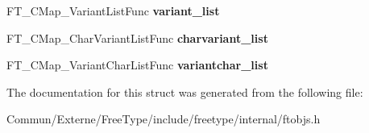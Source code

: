 \begin{DoxyCompactItemize}
\item 
F\+T\+\_\+\+C\+Map\+\_\+\+Variant\+List\+Func {\bfseries variant\+\_\+list}\hypertarget{struct_f_t___c_map___class_rec___ad61635444cbfc71c4259e74cb892c172}{}\label{struct_f_t___c_map___class_rec___ad61635444cbfc71c4259e74cb892c172}

\item 
F\+T\+\_\+\+C\+Map\+\_\+\+Char\+Variant\+List\+Func {\bfseries charvariant\+\_\+list}\hypertarget{struct_f_t___c_map___class_rec___a65db9dfa0e29b7de257dc8870532ab19}{}\label{struct_f_t___c_map___class_rec___a65db9dfa0e29b7de257dc8870532ab19}

\item 
F\+T\+\_\+\+C\+Map\+\_\+\+Variant\+Char\+List\+Func {\bfseries variantchar\+\_\+list}\hypertarget{struct_f_t___c_map___class_rec___ac1563590a0bac99082aa0996b94aad57}{}\label{struct_f_t___c_map___class_rec___ac1563590a0bac99082aa0996b94aad57}

\end{DoxyCompactItemize}


The documentation for this struct was generated from the following file\+:\begin{DoxyCompactItemize}
\item 
Commun/\+Externe/\+Free\+Type/include/freetype/internal/ftobjs.\+h\end{DoxyCompactItemize}

